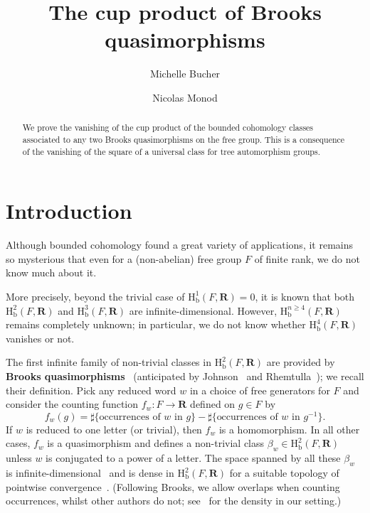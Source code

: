 \documentclass[11pt, a4paper]{amsart}
\newcommand{\RR}{\mathbf{R}}
\newcommand{\hb}{\mathrm{H}_\mathrm{b}}
\newcommand{\inv}{^{-1}}
\theoremstyle{plain}
\begin{document}
\title[The cup product of quasimorphisms]{The cup product of Brooks quasimorphisms}

\begin{abstract}
We prove the vanishing of the cup product of the bounded cohomology classes associated to any two Brooks quasimorphisms on the free group. This is a consequence of the vanishing of the square of a universal class for tree automorphism groups.
\end{abstract}

\author[M. Bucher]{Michelle Bucher}
\address{University of Geneva, 1211 Geneva 4, Switzerland}
\author[N. Monod]{Nicolas Monod}
\address{EPFL, SB-MATH-EGG, 1015 Lausanne, Switzerland}
\maketitle






\section{Introduction}%
Although bounded cohomology found a great variety of applications, it remains so mysterious that even for a (non-abelian) free group $F$ of finite rank, we do not know much about it. 

More precisely, beyond the trivial case of $\hb^1(F, \RR)=0$, it is known that both $\hb^2(F,\RR)$ and $\hb^3(F,\RR)$ are infinite-dimensional. However, $\hb^{n\geq 4}(F,\RR)$ remains completely unknown; in particular, we do not know whether $\hb^4(F,\RR)$ vanishes or not.

\medskip

The first infinite family of non-trivial classes in $\hb^2(F,\RR)$ are provided by \textbf{Brooks quasimorphisms}~\cite{Brooks} (anticipated by Johnson~\cite[2.8]{Johnson} and Rhemtulla~\cite{Rhemtulla68}); we recall their definition. Pick any reduced word $w$ in a choice of free generators for $F$ and consider the counting function $f_w\colon F\rightarrow \RR$ defined on $g\in F$ by
%
$$f_w(g)=\sharp\{\text{occurrences of $w$ in $g$}\} - \sharp\{\text{occurrences of $w$ in $g\inv$}\}.$$
%
If $w$ is reduced to one letter (or trivial), then $f_w$ is a homomorphism. In all other cases, $f_w$ is a quasimorphism and defines a non-trivial class $\beta_w\in \hb^2(F,\RR)$ unless $w$ is conjugated to a power of a letter. The space spanned by all these $\beta_w$ is infinite-dimensional~\cite{Brooks}\cite{Mitsumatsu} and is dense in $\hb^2(F,\RR)$ for a suitable topology of pointwise convergence~\cite[5.7]{Grigorchuk95}. (Following Brooks, we allow overlaps when counting occurrences, whilst other authors do not; see~\cite[p.~251]{Hartnick-Schweitzer} for the density in our setting.)
\end{document}
